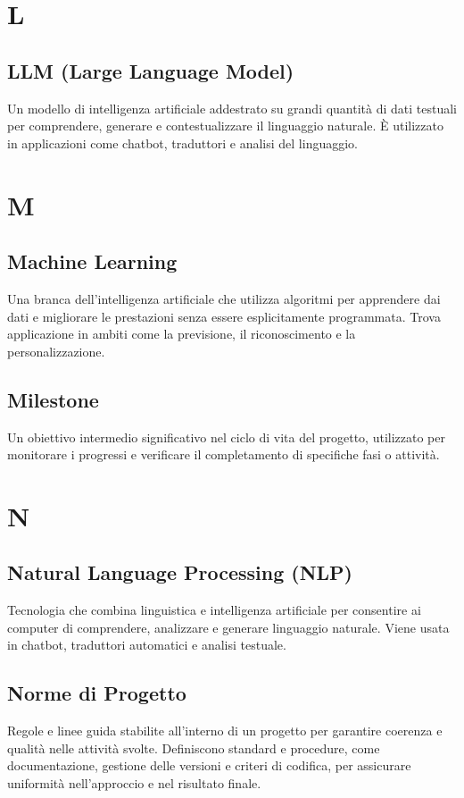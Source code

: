 \documentclass{article}
\begin{document}
\newpage

\section{L}

\subsection{LLM (Large Language Model)}
Un modello di intelligenza artificiale addestrato su grandi quantità di dati testuali per comprendere, generare e contestualizzare il linguaggio naturale. È utilizzato in applicazioni come chatbot, traduttori e analisi del linguaggio.

\newpage

\section{M}

\subsection{Machine Learning}
Una branca dell’intelligenza artificiale che utilizza algoritmi per apprendere dai dati e migliorare le prestazioni senza essere esplicitamente programmata. Trova applicazione in ambiti come la previsione, il riconoscimento e la personalizzazione.

\subsection{Milestone}
Un obiettivo intermedio significativo nel ciclo di vita del progetto, utilizzato per monitorare i progressi e verificare il completamento di specifiche fasi o attività.

\newpage

\section{N}

\subsection{Natural Language Processing (NLP)}
Tecnologia che combina linguistica e intelligenza artificiale per consentire ai computer di comprendere, analizzare e generare linguaggio naturale. Viene usata in chatbot, traduttori automatici e analisi testuale.

\subsection{Norme di Progetto}
Regole e linee guida stabilite all'interno di un progetto per garantire coerenza e qualità nelle attività svolte. Definiscono standard e procedure, come documentazione, gestione delle versioni e criteri di codifica, per assicurare uniformità nell'approccio e nel risultato finale.
\end{document}
